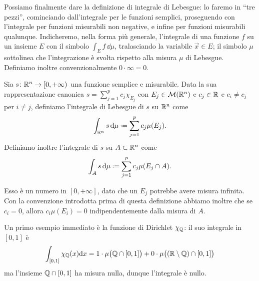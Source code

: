 Possiamo finalmente dare la definizione di integrale di Lebesgue: lo faremo in ``tre pezzi'', cominciando dall'integrale per le funzioni semplici, proseguendo con l'integrale per funzioni misurabili non negative, e infine per funzioni misurabili qualunque.
Indicheremo, nella forma più generale, l'integrale di una funzione $f$ su un insieme $E$ con il simbolo $\int_Ef\,\dd\mu$, tralasciando la variabile $\vec x\in E$; il simbolo $\mu$ sottolinea che l'integrazione è svolta rispetto alla misura $\mu$ di Lebesgue.
Definiamo inoltre convenzionalmente $0\cdot\infty=0$.
\begin{definizione} \label{d:integrale-lebesgue-funzioni-semplici}
	Sia $s\colon\mathbb{R}^n\to[0,+\infty)$ una funzione semplice e misurabile.
	Data la sua rappresentazione canonica $s=\sum_{j=1}^p c_j\chi_{E_j}$ con $E_j\in\mathcal M(\mathbb{R}^n)$ e $c_j\in\mathbb{R}$ e	$c_i\neq c_j$ per $i\neq j$, definiamo l'integrale di Lebesgue di $s$ su $\mathbb{R}^n$ come
	\begin{equation}
		\int_{\R^n}s\,\dd\mu\defeq \sum_{j=1}^pc_j\mu(E_j).
		\label{eq:integrale-lebesgue-funzioni-semplici}
	\end{equation}
	Definiamo inoltre l'integrale di $s$ su $A\subset\mathbb{R}^n$ come
	\begin{equation}
		\int_As\,\dd\mu\defeq \sum_{j=1}^pc_j\mu(E_j\cap A).
	\end{equation}
\end{definizione}
Esso è un numero in $[0,+\infty]$, dato che un $E_j$ potrebbe avere misura infinita.
Con la convenzione introdotta prima di questa definizione abbiamo inoltre che se $c_i=0$, allora $c_i\mu(E_i)=0$ indipendentemente dalla misura di $A$.

Un primo esempio immediato è la funzione di Dirichlet $\chi_{\mathbb{Q}}$: il suo integrale in $[0,1]$ è
\begin{equation*}
	\int_{[0,1]}\chi_{\mathbb{Q}}(x)\textup{d} x=1\cdot\mu\big(\mathbb{Q}\cap[0,1]\big)+0\cdot\mu\big( (\mathbb{R}\setminus\mathbb{Q})\cap[0,1]\big)
\end{equation*}
ma l'insieme $\mathbb{Q}\cap[0,1]$ ha misura nulla, dunque l'integrale è nullo.


